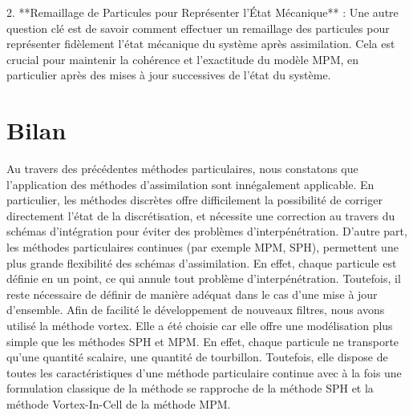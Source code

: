 2. **Remaillage de Particules pour Représenter l'État Mécanique** : Une autre question clé est de savoir comment effectuer un remaillage des particules pour représenter fidèlement l'état mécanique du système après assimilation. Cela est crucial pour maintenir la cohérence et l'exactitude du modèle MPM, en particulier après des mises à jour successives de l'état du système.


\section{Bilan}

Au travers des précédentes méthodes particulaires, nous constatons que l'application des méthodes d'assimilation sont innégalement applicable. En particulier, les méthodes discrètes offre difficilement la possibilité de corriger directement l'état de la discrétisation, et nécessite une correction au travers du schémas d'intégration pour éviter des problèmes d'interpénétration. D'autre part, les méthodes particulaires continues (par exemple MPM, SPH), permettent une plus grande flexibilité des schémas d'assimilation. En effet, chaque particule est définie en un point, ce qui annule tout problème d'interpénétration. Toutefois, il reste nécessaire de définir de manière adéquat dans le cas d'une mise à jour d'ensemble.
Afin de facilité le développement de nouveaux filtres, nous avons utilisé la méthode vortex. Elle a été choisie car elle offre une modélisation plus simple que les méthodes SPH et MPM. En effet, chaque particule ne transporte qu'une quantité scalaire, une quantité de tourbillon. Toutefois, elle dispose de toutes les caractéristiques d'une méthode particulaire continue avec à la fois une formulation classique de la méthode se rapproche de la méthode SPH et la méthode Vortex-In-Cell de la méthode MPM.
